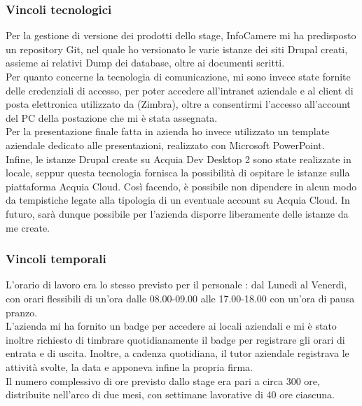 		\subsubsection{Vincoli tecnologici}
		Per la gestione di versione dei prodotti dello stage, InfoCamere mi ha predisposto un repository \gls{Git}, nel quale ho versionato le varie istanze dei siti \gls{Drupal} creati, assieme ai relativi \gls{Dump} dei database, oltre ai documenti scritti. \\
		Per quanto concerne la tecnologia di comunicazione, mi sono invece state fornite delle credenziali di accesso, per poter accedere all'intranet aziendale e al client di posta elettronica utilizzato da \nomeAzienda (\gls{Zimbra}), oltre a consentirmi l'accesso all'account del PC della postazione che mi è stata assegnata. \\
		Per la presentazione finale fatta in azienda ho invece utilizzato un template aziendale dedicato alle presentazioni, realizzato con Microsoft PowerPoint. \\
		Infine, le istanze \gls{Drupal} create su \gls{Acquia Dev Desktop 2} sono state realizzate in locale, seppur questa tecnologia fornisca la possibilità di ospitare le istanze sulla piattaforma \gls{Acquia Cloud}. Così facendo, è possibile non dipendere in alcun modo da tempistiche legate alla tipologia di un eventuale account su \gls{Acquia Cloud}. In futuro, sarà dunque possibile per l'azienda disporre liberamente delle istanze da me create.
		
		\subsubsection{Vincoli temporali}
		L'orario di lavoro era lo stesso previsto per il personale \nomeAzienda: dal Lunedì al Venerdì, con orari flessibili di un'ora dalle 08.00-09.00 alle 17.00-18.00 con un'ora di pausa pranzo. \\
		L'azienda mi ha fornito un badge per accedere ai locali aziendali e mi è stato inoltre richiesto di timbrare quotidianamente il badge per registrare gli orari di entrata e di uscita. Inoltre, a cadenza quotidiana, il tutor aziendale registrava le attività svolte, la data e apponeva infine la propria firma. \\
		Il numero complessivo di ore previsto dallo stage era pari a circa 300 ore, distribuite nell'arco di due mesi, con settimane lavorative di 40 ore ciascuna.

